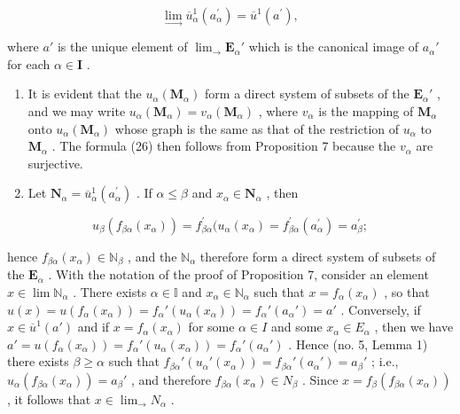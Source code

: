 \[
\lim _ {\rightarrow} \overline {{{u}}} _ {\alpha} ^ {1} (a _ {\alpha} ^ {\prime}) = \overline {{{u}}} ^ {1} (a ^ {\prime}),\tag{27}
\]

where \(a'\) is the unique element of \(\lim_{\rightarrow} \mathbf{E}_{\alpha}'\) which is the canonical image of \(a_{\alpha}'\) for each \(\alpha \in \mathbf{I}\) .

\begin{enumerate}
\def\labelenumi{(\roman{enumi})}
\item
  It is evident that the \(u_{\alpha}(\mathbf{M}_{\alpha})\) form a direct system of subsets of the \(\mathbf{E}_{\alpha}'\) , and we may write \(u_{\alpha}(\mathbf{M}_{\alpha}) = v_{\alpha}(\mathbf{M}_{\alpha})\) , where \(v_{\alpha}\) is the mapping of \(\mathbf{M}_{\alpha}\) onto \(u_{\alpha}(\mathbf{M}_{\alpha})\) whose graph is the same as that of the restriction of \(u_{\alpha}\) to \(\mathbf{M}_{\alpha}\) . The formula (26) then follows from Proposition 7 because the \(v_{\alpha}\) are surjective.
\item
  Let \(\mathbf{N}_{\alpha} = \overline{u}_{\alpha}^{1}(a_{\alpha}^{\prime})\) . If \(\alpha \leqslant \beta\) and \(x_{\alpha} \in \mathbf{N}_{\alpha}\) , then
\end{enumerate}

\[
u _ {\beta} (f _ {\beta \alpha} (x _ {\alpha})) = f _ {\beta \alpha} ^ {\prime} (u _ {\alpha} (x _ {\alpha}) = f _ {\beta \alpha} ^ {\prime} (a _ {\alpha} ^ {\prime}) = a _ {\beta} ^ {\prime};
\]

hence \(f_{\beta \alpha}(x_{\alpha}) \in \mathbb{N}_{\beta}\) , and the \(\mathbb{N}_{\alpha}\) therefore form a direct system of subsets of the \(\mathbf{E}_{\alpha}\) . With the notation of the proof of Proposition 7, consider an element \(x \in \lim \mathbb{N}_{\alpha}\) . There exists \(\alpha \in \mathbb{I}\) and \(x_{\alpha} \in \mathbb{N}_{\alpha}\) such that \(x = f_{\alpha}(x_{\alpha})\) , so that \(u(x) = u(f_{\alpha}(x_{\alpha})) = f_{\alpha}'(u_{\alpha}(x_{\alpha})) = f_{\alpha}'(a_{\alpha}') = a'\) . Conversely, if \(x \in \overline{u}^1(a')\) and if \(x = f_\alpha(x_\alpha)\) for some \(\alpha \in I\) and some \(x_\alpha \in E_\alpha\) , then we have \(a' = u(f_\alpha(x_\alpha)) = f_\alpha'(u_\alpha(x_\alpha)) = f_\alpha'(a_\alpha')\) . Hence (no. 5, Lemma 1) there exists \(\beta \geqslant \alpha\) such that \(f_{\beta\alpha}'(u_\alpha'(x_\alpha)) = f_{\beta\alpha}'(a_\alpha') = a_\beta'\) ; i.e., \(u_\alpha(f_{\beta\alpha}(x_\alpha)) = a_\beta'\) , and therefore \(f_{\beta\alpha}(x_\alpha) \in N_\beta\) . Since \(x = f_\beta(f_{\beta\alpha}(x_\alpha))\) , it follows that \(x \in \lim_{\rightarrow} N_\alpha\) .

